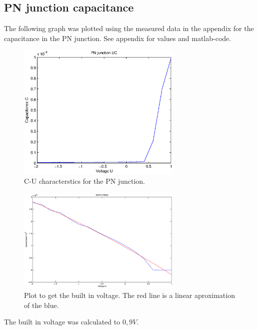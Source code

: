 \documentclass[a4paper]{article}
\begin{document}
\subsection{PN junction capacitance}
The following graph was plotted using the measured data in the appendix for the capacitance in the PN junction. See appendix for values and matlab-code. 
\begin{figure}[H]
	\centering
	\includegraphics[width=0.7\textwidth]{pn_cap.eps}
	\caption{C-U characterstics for the PN junction.}	
	\label{pn_cap}
\end{figure}
\begin{figure}[H]
	\centering
	\includegraphics[width=0.7\textwidth]{built_in_v.eps}
	\caption{Plot to get the built in voltage. The red line is a linear aproximation of the blue.}
	\label{pn_cap_built_in_v}
\end{figure}

The built in voltage was calculated to $0,9V$.
\end{document}
